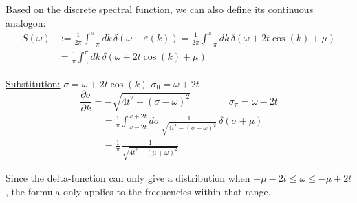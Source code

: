 Based on the discrete spectral function, we can also define its continuous analogon:
\begin{align*}
    S(\omega) &:= \frac{1}{2\pi} \int_{-\pi}^{\pi} dk\, \delta(\omega - \varepsilon(k)) = \frac{1}{2\pi} \int_{-\pi}^{\pi} dk\, \delta(\omega + 2t\cos(k) + \mu) \\
    &= \frac{1}{\pi} \int_{0}^{\pi} dk\, \delta(\omega + 2t\cos(k) + \mu)
\end{align*}

\underline{Substitution:} \qquad $\sigma = \omega + 2t\cos(k)$ \qquad\qquad $\sigma_0 = \omega + 2t$
\begin{equation*}
    \frac{\partial \sigma}{\partial k} = -\sqrt{4t^2 - (\sigma - \omega)^2} \qquad\qquad \sigma_\pi = \omega - 2t
\end{equation*}
\begin{align*}
    &= \frac{1}{\pi} \int_{\omega - 2t}^{\omega + 2t} d\sigma\, \frac{1}{\sqrt{4t^2 - (\sigma - \omega)^2}}\, \delta(\sigma + \mu) \\
    &= \frac{1}{\pi}\, \frac{1}{\sqrt{4t^2 - (\mu + \omega)^2}}
\end{align*}

Since the delta-function can only give a distribution when $-\mu - 2t \leq \omega \leq -\mu + 2t$, the formula only applies to the frequencies within that range.